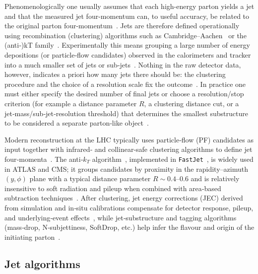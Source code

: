 Phenomenologically one usually assumes that each high-energy parton yields a jet and that the measured jet four-momentum can, to useful accuracy, be related to the original parton four-momentum~\cite{Catani:1993,Ellis:1993}. Jets are therefore defined operationally using recombination (clustering) algorithms such as Cambridge–Aachen~\cite{Dokshitzer:1997} or the (anti‑)kT family~\cite{Cacciari:2008gp}. Experimentally this means grouping a large number of energy depositions (or particle‑flow candidates) observed in the calorimeters and tracker into a much smaller set of jets or sub‑jets~\cite{CMS:PF2017}. Nothing in the raw detector data, however, indicates a priori how many jets there should be: the clustering procedure and the choice of a resolution scale fix the outcome~\cite{Salam:2010}. In practice one must either specify the desired number of final jets or choose a resolution/stop criterion (for example a distance parameter $R$, a clustering distance cut, or a jet‑mass/sub‑jet‑resolution threshold) that determines the smallest substructure to be considered a separate parton‑like object~\cite{Thaler:2011}.

Modern reconstruction at the LHC typically uses particle‑flow (PF) candidates as input together with infrared‑ and collinear‑safe clustering algorithms to define jet four‑momenta~\cite{CMS:PF2017,Cacciari:2011ma}. The anti‑$k_T$ algorithm~\cite{Cacciari:2008gp}, implemented in \texttt{FastJet}~\cite{Cacciari:2011ma}, is widely used in ATLAS and CMS; it groups candidates by proximity in the rapidity–azimuth $(y,\phi)$ plane with a typical distance parameter $R\sim0.4$–0.6 and is relatively insensitive to soft radiation and pileup when combined with area‑based subtraction techniques~\cite{Cacciari:2008area}. After clustering, jet energy corrections (JEC) derived from simulation and in‑situ calibrations compensate for detector response, pileup, and underlying‑event effects~\cite{CMS:JEC}, while jet‑substructure and tagging algorithms (mass‑drop, N‑subjettiness, SoftDrop, etc.) help infer the flavour and origin of the initiating parton~\cite{Butterworth:2008,Thaler:2011,Larkoski:2014}.


\subsection{Jet algorithms}


